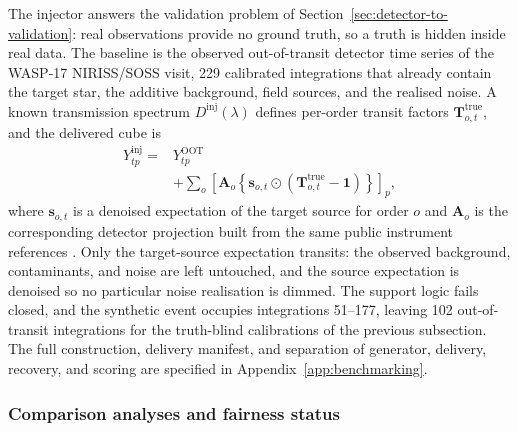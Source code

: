 The injector answers the validation problem of
Section~\ref{sec:detector-to-validation}: real observations provide no
ground truth, so a truth is hidden inside real data. The baseline is the
observed out-of-transit detector time series of the WASP-17 NIRISS/SOSS
visit, 229 calibrated integrations that already contain the target star,
the additive background, field sources, and the realised noise. A known
transmission spectrum $D^{\mathrm{inj}}(\lambda)$ defines per-order
transit factors $\bm{T}^{\mathrm{true}}_{o,t}$, and the delivered cube is
\begin{equation}
\begin{split}
 Y^{\mathrm{inj}}_{tp}
 = {}& Y^{\mathrm{OOT}}_{tp} \\
 & + \sum_{o}\left[\bm{A}_o\!\left\{\bm{s}_{o,t}\odot
   \left(\bm{T}^{\mathrm{true}}_{o,t}-\bm{1}\right)\right\}\right]_p ,
\end{split}
 \label{eq:v45-injector}
\end{equation}
where $\bm{s}_{o,t}$ is a denoised expectation of the target source for
order $o$ and $\bm{A}_o$ is the corresponding detector projection built
from the same public instrument references
\citep{BainesEtAl2023Trace,BainesEtAl2023Wavelength,DarveauBernierEtAl2022}.
Only the target-source expectation transits: the observed background,
contaminants, and noise are left untouched, and the source expectation is
denoised so no particular noise realisation is dimmed. The support logic
fails closed, and the synthetic event occupies integrations 51--177,
leaving 102 out-of-transit integrations for the truth-blind calibrations
of the previous subsection. The full construction, delivery manifest, and
separation of generator, delivery, recovery, and scoring are specified in
Appendix~\ref{app:benchmarking}.

\subsubsection{Comparison analyses and fairness status}



